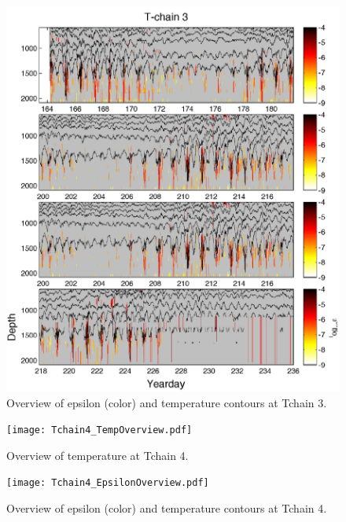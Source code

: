 \documentclass[11pt]{article}
\begin{document}
\begin{figure}[htbp]
\includegraphics[scale=0.9]{Tchain3_EpsilonOverview.pdf}
\caption{Overview of epsilon (color) and temperature contours at Tchain 3.}
\label{}
\end{figure}


\begin{figure}[htbp]
\texttt{[image: Tchain4\_TempOverview.pdf]}
\caption{Overview of temperature at Tchain 4.}
\label{}
\end{figure}

\begin{figure}[htbp]
\texttt{[image: Tchain4\_EpsilonOverview.pdf]}
\caption{Overview of epsilon (color) and temperature contours at Tchain 4.}
\label{}
\end{figure}
\end{document}
